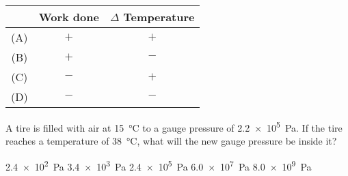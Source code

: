 \documentclass{../../../oss-ap12ibhl}
\begin{document}
\begin{questions}
  \begin{minipage}{.28\textwidth}
  \end{minipage}
  \begin{minipage}{.34\textwidth}
    \begin{tabular}{ccc}
      & \textbf{Work done} & $\Delta$ \textbf{Temperature}\\ \hline
      (A) & $+$ & $+$ \\
      (B) & $+$ & $-$ \\
      (C) & $-$ & $+$ \\
      (D) & $-$ & $-$
    \end{tabular}
  \end{minipage}
    
    
    
  \question A tire is filled with air at \SI{15}{\celsius} to a gauge pressure
  of \SI{2.2e5}{\pascal}. If the tire reaches a temperature of
  \SI{38}{\celsius}, what will the new gauge pressure be inside it?
  \begin{choices}
    \choice\SI{2.4e2}{\pascal}
    \choice\SI{3.4e3}{\pascal}
    \choice\SI{2.4e5}{\pascal}
    \choice\SI{6.0e7}{\pascal}
    \choice\SI{8.0e9}{\pascal}
  \end{choices}


\end{questions}
\end{document}
